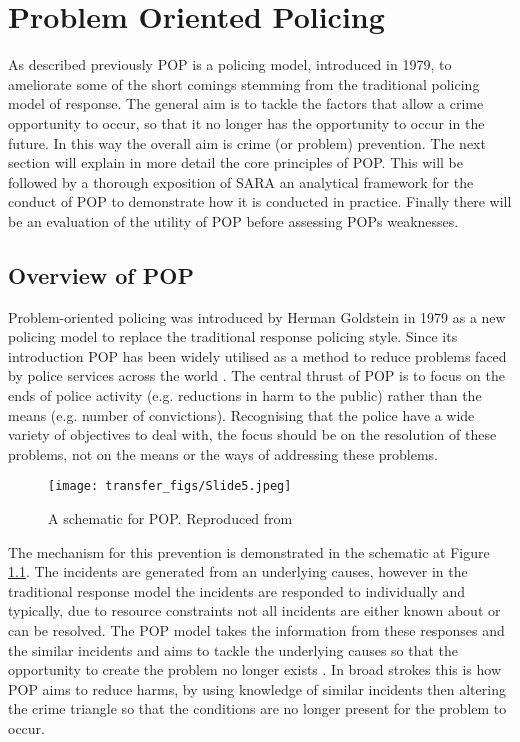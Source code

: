 

\chapter{Problem Oriented Policing}

As described previously POP is a policing model, introduced in 1979, to ameliorate some of the short comings stemming from the traditional policing model of response. The general aim is to tackle the factors that allow a crime opportunity to occur, so that it no longer has the opportunity to occur in the future. In this way the overall aim is crime (or problem) prevention.  The next section will explain in more detail the core principles of POP. This will be followed by a thorough exposition of SARA an analytical framework for the conduct of POP to demonstrate how it is conducted in practice. Finally there will be an evaluation of the utility of POP before assessing POPs weaknesses.

\section{Overview of POP}

Problem-oriented policing was introduced by Herman Goldstein in 1979 \parencite{gold79} as a new policing model to replace the traditional response policing style. Since its introduction POP has been widely utilised as a method to reduce problems faced by police services across the world \parencite{fairnessandeffectivenessinpolicing_2004, stockholmlec}. The central thrust of POP is to focus on the ends of police activity (e.g. reductions in harm to the public) rather than the means (e.g. number of convictions). Recognising that the police have a wide variety of objectives to deal with, the focus should be on the resolution of these problems, not on the means or the ways of addressing these problems. 

\begin{figure}
  \texttt{[image: transfer\_figs/Slide5.jpeg]}
  \caption[A schematic of POP.]{A schematic for POP. Reproduced from \textcite{eck1987problem}}
  \label{fig:POP}
\end{figure}

The mechanism for this prevention is demonstrated in the schematic at Figure \ref{fig:POP}. The incidents are generated from an underlying causes, however in the traditional response model the incidents are responded to individually and typically, due to resource constraints not all incidents are either known about or can be resolved. The POP model takes the information from these responses and the similar incidents and aims to tackle the underlying causes so that the opportunity to create the problem no longer exists \parencite{eck1987problem}. In broad strokes this is how POP aims to reduce harms, by using knowledge of similar incidents then altering the crime triangle so that the conditions are no longer present for the problem to occur.


